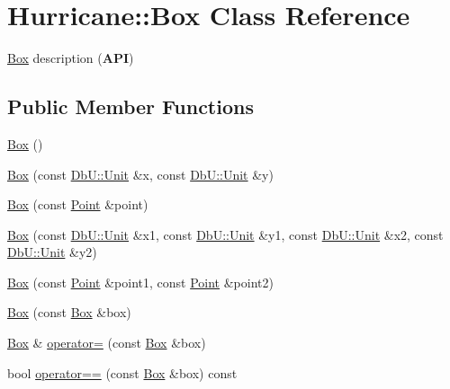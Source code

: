 \hypertarget{classHurricane_1_1Box}{\section{Hurricane\-:\-:Box Class Reference}
\label{classHurricane_1_1Box}
}


\hyperlink{classHurricane_1_1Box}{Box} description ({\bfseries A\-P\-I})  


\subsection*{Public Member Functions}
\begin{DoxyCompactItemize}
\item 
\hyperlink{classHurricane_1_1Box_a445dd24bf83759bb47fc483fc7da024f}{Box} ()
\item 
\hyperlink{classHurricane_1_1Box_af53adb323e9e89eef4e96da9efc33fe9}{Box} (const \hyperlink{group__DbUGroup_ga4fbfa3e8c89347af76c9628ea06c4146}{Db\-U\-::\-Unit} \&x, const \hyperlink{group__DbUGroup_ga4fbfa3e8c89347af76c9628ea06c4146}{Db\-U\-::\-Unit} \&y)
\item 
\hyperlink{classHurricane_1_1Box_a2f2aa57fa9486b508fca2a060648d04a}{Box} (const \hyperlink{classHurricane_1_1Point}{Point} \&point)
\item 
\hyperlink{classHurricane_1_1Box_a101cd5a10d6cf229ccedccbb5417ed55}{Box} (const \hyperlink{group__DbUGroup_ga4fbfa3e8c89347af76c9628ea06c4146}{Db\-U\-::\-Unit} \&x1, const \hyperlink{group__DbUGroup_ga4fbfa3e8c89347af76c9628ea06c4146}{Db\-U\-::\-Unit} \&y1, const \hyperlink{group__DbUGroup_ga4fbfa3e8c89347af76c9628ea06c4146}{Db\-U\-::\-Unit} \&x2, const \hyperlink{group__DbUGroup_ga4fbfa3e8c89347af76c9628ea06c4146}{Db\-U\-::\-Unit} \&y2)
\item 
\hyperlink{classHurricane_1_1Box_a47f434b4dbda6af14a354722f66a47da}{Box} (const \hyperlink{classHurricane_1_1Point}{Point} \&point1, const \hyperlink{classHurricane_1_1Point}{Point} \&point2)
\item 
\hyperlink{classHurricane_1_1Box_af9a7605270bf1ebb38723fba5b9d9236}{Box} (const \hyperlink{classHurricane_1_1Box}{Box} \&box)
\item 
\hyperlink{classHurricane_1_1Box}{Box} \& \hyperlink{classHurricane_1_1Box_a01abf59b3d3e99e694a7d4789f1bb978}{operator=} (const \hyperlink{classHurricane_1_1Box}{Box} \&box)
\item 
bool \hyperlink{classHurricane_1_1Box_ab642284ed016da7a614b56ec9461c710}{operator==} (const \hyperlink{classHurricane_1_1Box}{Box} \&box) const 

\end{DoxyCompactItemize}
